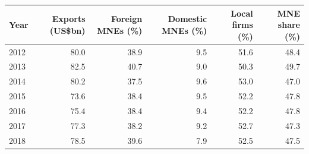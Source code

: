 \begin{tabular}{lrrrrr}
\toprule
Year & Exports (US\$bn) & Foreign MNEs (\%) & Domestic MNEs (\%) & Local firms (\%) & MNE share (\%) \\
\midrule
2012 & 80.0 & 38.9 & 9.5 & 51.6 & 48.4 \\
2013 & 82.5 & 40.7 & 9.0 & 50.3 & 49.7 \\
2014 & 80.2 & 37.5 & 9.6 & 53.0 & 47.0 \\
2015 & 73.6 & 38.4 & 9.5 & 52.2 & 47.8 \\
2016 & 75.4 & 38.4 & 9.4 & 52.2 & 47.8 \\
2017 & 77.3 & 38.2 & 9.2 & 52.7 & 47.3 \\
2018 & 78.5 & 39.6 & 7.9 & 52.5 & 47.5 \\
\bottomrule
\end{tabular}
